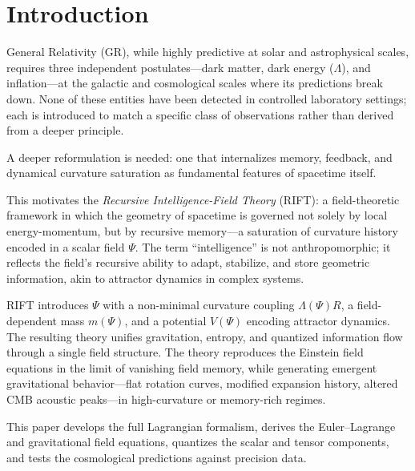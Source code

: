 \documentclass[12pt,a4paper]{article}
\begin{document}
\tableofcontents
\newpage

\section{Introduction}
\label{sec:intro}

General Relativity (GR), while highly predictive at solar and
astrophysical scales, requires three independent postulates---dark
matter, dark energy ($\Lambda$), and inflation---at the galactic and
cosmological scales where its predictions break down. None of these
entities have been detected in controlled laboratory settings; each
is introduced to match a specific class of observations rather than
derived from a deeper principle.

A deeper reformulation is needed: one that internalizes memory, feedback,
and dynamical curvature saturation as fundamental features of spacetime
itself.

This motivates the \emph{Recursive Intelligence-Field Theory} (RIFT):
a field-theoretic framework in which the geometry of spacetime is
governed not solely by local energy-momentum, but by recursive memory---a
saturation of curvature history encoded in a scalar field $\Psi$. The
term ``intelligence'' is not anthropomorphic; it reflects the field's
recursive ability to adapt, stabilize, and store geometric information,
akin to attractor dynamics in complex systems.

RIFT introduces $\Psi$ with a non-minimal curvature coupling $\Lambda(\Psi)R$,
a field-dependent mass $m(\Psi)$, and a potential $V(\Psi)$ encoding
attractor dynamics. The resulting theory unifies gravitation, entropy,
and quantized information flow through a single field structure. The
theory reproduces the Einstein field equations in the limit of vanishing
field memory, while generating emergent gravitational behavior---flat
rotation curves, modified expansion history, altered CMB acoustic
peaks---in high-curvature or memory-rich regimes.

This paper develops the full Lagrangian formalism, derives the Euler--Lagrange
and gravitational field equations, quantizes the scalar and tensor components,
and tests the cosmological predictions against precision data.
\end{document}
